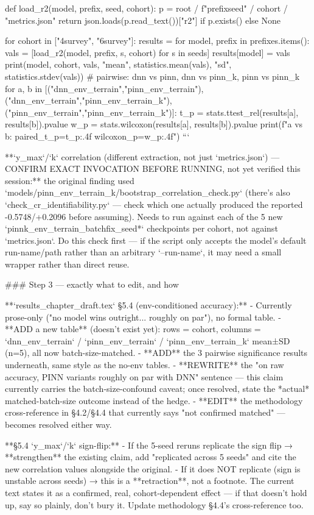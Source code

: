 def load_r2(model, prefix, seed, cohort):
    p = root / f"{prefix}{seed}" / cohort / "metrics.json"
    return json.loads(p.read_text())["r2"] if p.exists() else None

for cohort in ["4survey", "6survey"]:
    results = {}
    for model, prefix in prefixes.items():
        vals = [load_r2(model, prefix, s, cohort) for s in seeds]
        results[model] = vals
        print(model, cohort, vals, "mean", statistics.mean(vals), "sd", statistics.stdev(vals))
    # pairwise: dnn vs pinn, dnn vs pinn_k, pinn vs pinn_k
    for a, b in [("dnn_env_terrain","pinn_env_terrain"), ("dnn_env_terrain","pinn_env_terrain_k"),
                 ("pinn_env_terrain","pinn_env_terrain_k")]:
        t_p = stats.ttest_rel(results[a], results[b]).pvalue
        w_p = stats.wilcoxon(results[a], results[b]).pvalue
        print(f"{a} vs {b}: paired_t_p={t_p:.4f} wilcoxon_p={w_p:.4f}")
```

**`y_max`/`k` correlation (different extraction, not just `metrics.json`) — CONFIRM EXACT
INVOCATION BEFORE RUNNING, not yet verified this session:** the original finding used
`models/pinn_env_terrain_k/bootstrap_correlation_check.py` (there's also
`check_cr_identifiability.py` — check which one actually produced the reported -0.5748/+0.2096
before assuming). Needs to run against each of the 5 new `pinnk_env_terrain_batchfix_seed*`
checkpoints per cohort, not against `metrics.json`. Do this check first — if the script only
accepts the model's default run-name/path rather than an arbitrary `--run-name`, it may need a
small wrapper rather than direct reuse.

### Step 3 — exactly what to edit, and how

**`results_chapter_draft.tex` §5.4 (env-conditioned accuracy):**
- Currently prose-only ("no model wins outright... roughly on par"), no formal table.
- **ADD a new table** (doesn't exist yet): rows = cohort, columns = `dnn_env_terrain` /
  `pinn_env_terrain` / `pinn_env_terrain_k` mean±SD (n=5), all now batch-size-matched.
- **ADD** the 3 pairwise significance results underneath, same style as the no-env tables.
- **REWRITE** the "on raw accuracy, PINN variants roughly on par with DNN" sentence — this
  claim currently carries the batch-size-confound caveat; once resolved, state the *actual*
  matched-batch-size outcome instead of the hedge.
- **EDIT** the methodology cross-reference in §4.2/§4.4 that currently says "not confirmed
  matched" — becomes resolved either way.

**§5.4 `y_max`/`k` sign-flip:**
- If the 5-seed reruns replicate the sign flip → **strengthen** the existing claim, add "replicated
  across 5 seeds" and cite the new correlation values alongside the original.
- If it does NOT replicate (sign is unstable across seeds) → this is a **retraction**, not a footnote.
  The current text states it as a confirmed, real, cohort-dependent effect — if that doesn't hold up,
  say so plainly, don't bury it. Update methodology §4.4's cross-reference too.

